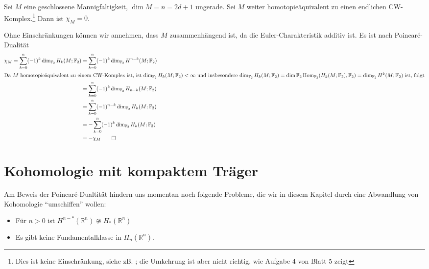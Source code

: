 \begin{satz}
	Sei $M$ eine geschlossene Mannigfaltigkeit, $\dim M = n = 2d +1$ ungerade. 
	Sei $M$ weiter homotopieäquivalent zu einen endlichen CW-Komplex.\footnote{Dies ist keine Einschränkung, siehe zB. \cite[Cor. A.12]{Hatcher}; die Umkehrung ist aber nicht richtig, wie Aufgabe 4 von Blatt 5 zeigt} 
	Dann ist $\chi_M =0$.
\end{satz}
\begin{beweis}
	Ohne Einschränkungen können wir annehmen, dass $M$ zusammenhängend ist, da die Euler-Charakteristik additiv ist. Es ist nach Poincaré-Dualität 
	\begin{align}
		\chi_M = \sum_{k=0}^{n} (-1)^k \dim_{\mathbb{F}_2} H_k(M;\mathbb{F}_2) &= \sum_{k=0}^{n} (-1)^k \dim_{\mathbb{F}_2} H^{n-k}(M;\mathbb{F}_2) \\
		\intertext{Da $M$ homotopieäquivalent zu einem CW-Komplex ist, ist $\dim_{\mathbb{F}_2} H_k(M; \mathbb{F}_2)<\infty $ und insbesondere $\dim_{\mathbb{F}_2} H_k(M;\mathbb{F}_2) = \dim \mathbb{F}_2 \Hom_{\mathbb{F}_2} \enbrace*{H_k(M; \mathbb{F}_2),\mathbb{F}_2} = \dim_{\mathbb{F}_2} H^k(M; \mathbb{F}_2)$ ist, folgt}
		&= \sum_{k=0}^{n} (-1)^k \dim_{\mathbb{F}_2} H_{n-k}(M; \mathbb{F}_2) \\
		&= \sum_{k=0}^{n} (-1)^{n-k} \dim_{\mathbb{F}_2} H_k(M; \mathbb{F}_2) \\
		&= - \sum_{k=0}^{n} (-1)^k \dim_{\mathbb{F}_2} H_k(M;\mathbb{F}_2) \\
		&= - \chi_M \qedhere
	\end{align}
\end{beweis}
\newpage

\section{Kohomologie mit kompaktem Träger} %
\label{sec:7}

\begin{bemerkung}[{name=[Probleme beim Beweis der Poincaré-Dualität]}]
	Am Beweis der Poincaré-Dualtität hindern uns momentan noch folgende Probleme, die wir in diesem Kapitel durch eine Abwandlung von Kohomologie \enquote{umschiffen} wollen: 
	\begin{itemize}[itemsep=0pt]
		\item Für $n>0$ ist  $H^{n-*}(\mathbb{R}^n) \ncong H_*(\mathbb{R}^n)$
		\item Es gibt keine Fundamentalklasse in $H_n(\mathbb{R}^n)$.
	\end{itemize}
\end{bemerkung}

